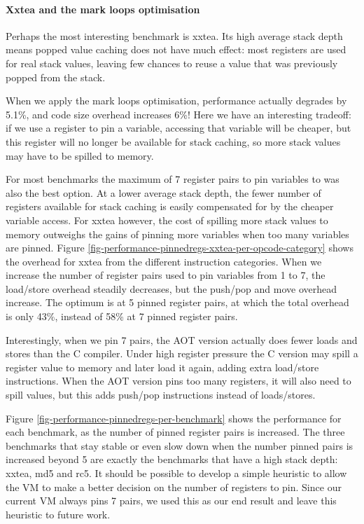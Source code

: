 \paragraph{Xxtea and the mark loops optimisation} Perhaps the most interesting benchmark is xxtea. Its high average stack depth means popped value caching does not have much effect: most registers are used for real stack values, leaving few chances to reuse a value that was previously popped from the stack. 

When we apply the mark loops optimisation, performance actually degrades by 5.1\%, and code size overhead increases 6\%! Here we have an interesting tradeoff: if we use a register to pin a variable, accessing that variable will be cheaper, but this register will no longer be available for stack caching, so more stack values may have to be spilled to memory.

For most benchmarks the maximum of 7 register pairs to pin variables to was also the best option. At a lower average stack depth, the fewer number of registers available for stack caching is easily compensated for by the cheaper variable access. For xxtea however, the cost of spilling more stack values to memory outweighs the gains of pinning more variables when too many variables are pinned. Figure \ref{fig-performance-pinnedregs-xxtea-per-opcode-category} shows the overhead for xxtea from the different instruction categories. When we increase the number of register pairs used to pin variables from 1 to 7, the load/store overhead steadily decreases, but the push/pop and move overhead increase. The optimum is at 5 pinned register pairs, at which the total overhead is only 43\%, instead of 58\% at 7 pinned register pairs.

 Interestingly, when we pin 7 pairs, the AOT version actually does fewer loads and stores than the C compiler. Under high register pressure the C version may spill a register value to memory and later load it again, adding extra load/store instructions. When the AOT version pins too many registers, it will also need to spill values, but this adds push/pop instructions instead of loads/stores.

Figure \ref{fig-performance-pinnedregs-per-benchmark} shows the performance for each benchmark, as the number of pinned register pairs is increased. The three benchmarks that stay stable or even slow down when the number pinned pairs is increased beyond 5 are exactly the benchmarks that have a high stack depth: xxtea, md5 and rc5. It should be possible to develop a simple heuristic to allow the VM to make a better decision on the number of registers to pin. Since our current VM always pins 7 pairs, we used this as our end result and leave this heuristic to future work.


